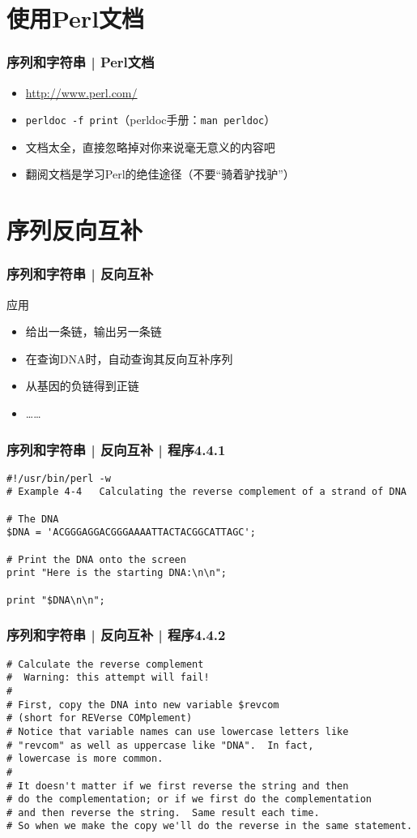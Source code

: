 \section{使用Perl文档}
\begin{frame}[fragile]
  \frametitle{序列和字符串 | \alert{Perl文档}}
  \begin{itemize}
    \item \href{http://www.perl.com/}{http://www.perl.com/} 
    \item \verb|perldoc -f print|（perldoc手册：\verb|man perldoc|）
    \item 文档太全，直接忽略掉对你来说毫无意义的内容吧
    \item 翻阅文档是学习Perl的绝佳途径（不要“骑着驴找驴”）
  \end{itemize}
\end{frame}

\section{序列反向互补}
\begin{frame}
  \frametitle{序列和字符串 | 反向互补}
  \begin{block}{应用}
    \begin{itemize}
      \item 给出一条链，输出另一条链
      \item 在查询DNA时，自动查询其反向互补序列
      \item 从基因的负链得到正链
      \item ……
    \end{itemize}
  \end{block}
\end{frame}

\begin{frame}[fragile]
  \frametitle{序列和字符串 | 反向互补 | 程序4.4.1}
\begin{lstlisting}
#!/usr/bin/perl -w
# Example 4-4   Calculating the reverse complement of a strand of DNA

# The DNA
$DNA = 'ACGGGAGGACGGGAAAATTACTACGGCATTAGC';

# Print the DNA onto the screen
print "Here is the starting DNA:\n\n";

print "$DNA\n\n";
\end{lstlisting}
\end{frame}

\begin{frame}[fragile]
  \frametitle{序列和字符串 | 反向互补 | 程序4.4.2}
\begin{lstlisting}[firstnumber=12,basicstyle=\footnotesize\tt]
# Calculate the reverse complement
#  Warning: this attempt will fail!
#
# First, copy the DNA into new variable $revcom
# (short for REVerse COMplement)
# Notice that variable names can use lowercase letters like
# "revcom" as well as uppercase like "DNA".  In fact,
# lowercase is more common.
#
# It doesn't matter if we first reverse the string and then
# do the complementation; or if we first do the complementation
# and then reverse the string.  Same result each time.
# So when we make the copy we'll do the reverse in the same statement.
\end{lstlisting}
\end{frame}

